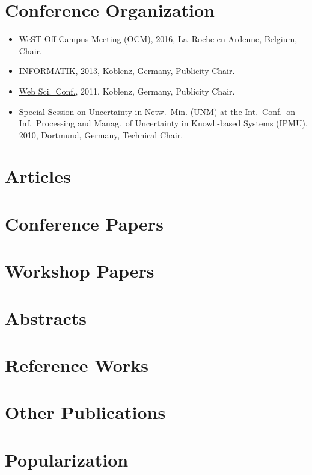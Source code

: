 \documentclass[line,mm]{res}
\newcounter{y}
\begin{document}
\begin{resume}
\section{Conference Organization}
\begin{itemize}
\item 
  \href{https://sites.google.com/site/ocm2016/}{WeST Off-Campus
  Meeting} (OCM), 2016, La~Roche-en-Ardenne, Belgium, Chair. 
\item
  \href{http://informatik2013.de/}{INFORMATIK}, 2013, Koblenz, Germany, Publicity Chair. 
\item
  \href{http://www.websci11.org/}{Web Sci.\ Conf.}, 2011, Koblenz, Germany,
  Publicity Chair.  
\item
  \href{http://www.dai-labor.de/unm2010/}{Special Session on
  Uncertainty in Netw.\ Min.} (UNM) at the Int.\ Conf.\ on Inf.\ Processing and Manag.\ of Uncertainty in Knowl.-based Systems (IPMU),
  2010, Dortmund, Germany, Technical Chair.   
\end{itemize}

\section{Articles}           
\section{Conference Papers}  
\section{Workshop Papers}    
\section{Abstracts}          
\section{Reference Works}    
\section{Other Publications} 
\section{Popularization}     


\end{resume}
\end{document}
